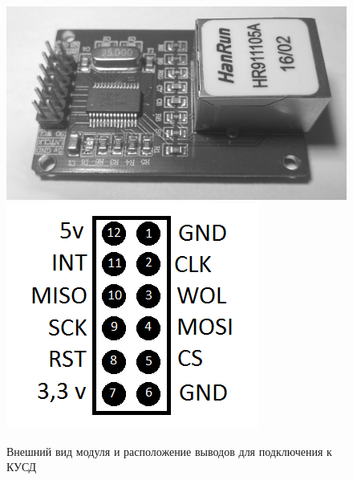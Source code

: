 \begin{figure}[h!]
	\centering
		\includegraphics[scale=0.1]{img/ethcontroller.png}
		\includegraphics[scale=0.5]{img/ethpins.png}
	\caption{Внешний вид модуля и расположение выводов для подключения к КУСД\label{fig:ethcontroller}}
\end{figure}



